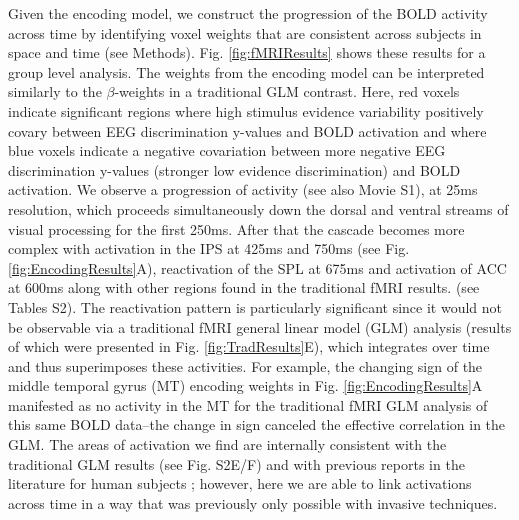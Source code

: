 Given the encoding model, we construct the progression of the BOLD activity across time by identifying voxel weights that are consistent across subjects in space and time (see Methods). Fig. \ref{fig:fMRIResults} shows these results for a group level analysis. The weights from the encoding model can be interpreted similarly to the $\beta$-weights in a traditional GLM contrast. Here, red voxels indicate significant regions where high stimulus evidence variability positively covary between EEG discrimination y-values and BOLD activation and where blue voxels indicate a negative covariation between more negative EEG discrimination y-values (stronger low evidence discrimination) and BOLD activation. We observe a progression of activity (see also Movie S1), at 25ms resolution, which proceeds simultaneously down the dorsal and ventral streams of visual processing for the first 250ms. After that the cascade becomes more complex with activation in the IPS at 425ms and 750ms (see Fig. \ref{fig:EncodingResults}A), reactivation of the SPL at 675ms and activation of ACC at 600ms along with other regions found in the traditional fMRI results. (see Tables S2). The reactivation pattern is particularly significant since it would not be observable via a traditional fMRI general linear model (GLM) analysis (results of which were presented in Fig. \ref{fig:TradResults}E), which integrates over time and thus superimposes these activities. For example, the changing sign of the middle temporal gyrus (MT) encoding weights in Fig. \ref{fig:EncodingResults}A manifested as no activity in the MT for the traditional fMRI GLM analysis of this same BOLD data--the change in sign canceled the effective correlation in the GLM. The areas of activation we find are internally consistent with the traditional GLM results (see Fig. S2E/F) and with previous reports in the literature for human subjects \cite{Heekeren2004,Philiastides2007}; however, here we are able to link activations across time in a way that was previously only possible with invasive techniques. 

